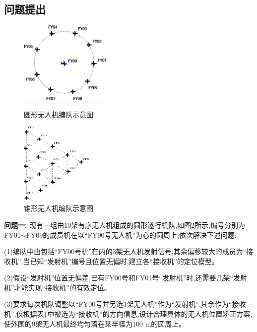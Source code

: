 \documentclass[withoutpreface,bwprint]{cumcmthesis}
\begin{document}
	
	\subsection{问题提出}
	\begin{figure}[!htpb]
		\begin{minipage}{0.48\linewidth}
			\centering
			\includegraphics[height=4cm]{./figures/1-2.png}
			\caption{圆形无人机编队示意图}\label{fig:2}
		\end{minipage}
		\begin{minipage}{0.48\linewidth}
			\centering
			\includegraphics[height=4cm]{./figures/1-3.png}
			\caption{锥形无人机编队示意图}\label{fig:3}
		\end{minipage}
	\end{figure}	
	
	\noindent\textbf{问题一:}
	现有一组由10架有序无人机组成的圆形遂行机队,如图2所示,编号分别为FY01$\sim$FY09的成员机在以“FY00号无人机”为心的圆周上,依次解决下述问题:
	
	(1)编队中由包括“FY00号机”在内的3架无人机发射信号,其余偏移较大的成员为“接收机”,当已知“发射机”编号且位置无偏时,建立各“接收机”的定位模型。
	
	(2)假设“发射机”位置无偏差,已有FY00号和FY01号“发射机”时,还需要几架“发射机”才能实现“接收机”的有效定位。%
	
	(3)要求每次机队调整以“FY00号并另选3架无人机”作为“发射机”,其余作为“接收机”,仅根据表1中被选为“接收机”的方向信息,设计合理具体的无人机位置矫正方案,使外围的9架无人机最终均匀落在某半径为100 m的圆周上。
	
\end{document}
